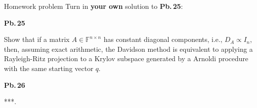 \documentclass[t,usepdftitle=false]{beamer}
\begin{document}
\begin{frame}{Homework problem}\vspace{.1cm}
Turn in \textbf{your own} solution to \textbf{Pb.$\,$25}:\vspace{.15cm}\\
\begin{minipage}[t]{0.1\textwidth}
\textbf{Pb.$\,$25}
\end{minipage}
\begin{minipage}[t]{0.89\textwidth}
Show that if a matrix $A\in\mathbb{F}^{n\times n}$ has constant diagonal components, i.e., $D_A\propto I_n$, then, assuming exact arithmetic, the Davidson method is equivalent to applying a Rayleigh-Ritz projection to a Krylov subspace generated by a Arnoldi procedure with the same starting vector $q$.
\end{minipage}\vspace{.15cm}
\begin{minipage}[t]{0.1\textwidth}
\textbf{Pb.$\,$26}
\end{minipage}
\begin{minipage}[t]{0.89\textwidth}
***.
\end{minipage}\vspace{.15cm}
\end{frame}
\end{document}
